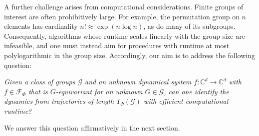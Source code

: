 \documentclass[11pt]{article}
\theoremstyle{plain}
\theoremstyle{definition}
\theoremstyle{remark}
\begin{document}
A further challenge arises from computational considerations. Finite
groups of interest are often prohibitively large. For example, the permutation group on \(n\) elements has cardinality
\(n! \approx \exp(n \log n)\), as do many of its subgroups.
Consequently, algorithms whose runtime scales linearly with the group size
are infeasible, and one must instead aim for procedures with runtime at most 
polylogarithmic in the group size.
Accordingly, our aim is to address the following question:
\begin{tcolorbox}
\emph{Given a class of groups $\mathcal{G}$ and an unknown dynamical system
$f:\mathbb{C}^d \to \mathbb{C}^d$ with $f \in \mathcal{F}_\Phi$ that is
$G$-equivariant for an unknown $G \in \mathcal{G}$, can one identify the
dynamics from trajectories of length $T_\Phi(\mathcal{G})$ with efficient
computational runtime?}
\end{tcolorbox}

We answer this question affirmatively in the next section.
 








\end{document}

